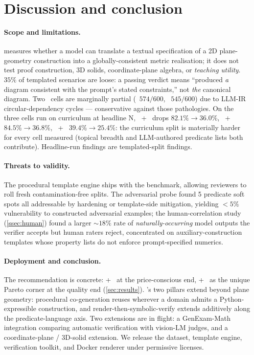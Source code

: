 \section{Discussion and conclusion}
\label{sec:discussion}

\paragraph{Scope and limitations.}
\GeoGenBench measures whether a model can translate a textual specification of a 2D plane-geometry construction into a globally-consistent metric realisation; it does not test proof construction, 3D solids, coordinate-plane algebra, or \emph{teaching utility}.
$35\%$ of templated scenarios are loose: a passing verdict means ``produced \emph{a} diagram consistent with the prompt's stated constraints,'' not \emph{the} canonical diagram.
Two \structured\ cells are marginally partial (\opus\ $574/600$, \gpt\ $545/600$) due to LLM-IR circular-dependency cycles --- conservative against those pathologies.
On the three cells run on curriculum at headline N, \haiku\ + \rawcode\ drops $82.1\% \to 36.0\%$, \haiku\ + \structured\ $84.5\% \to 36.8\%$, \geminiflash\ + \rawcode\ $39.4\% \to 25.4\%$: the curriculum split is materially harder for every cell measured (topical breadth and LLM-authored predicate lists both contribute).
Headline-run findings are templated-split findings.

\paragraph{Threats to validity.}
The procedural template engine ships with the benchmark, allowing reviewers to roll fresh contamination-free splits.
The adversarial probe found 5 predicate soft spots all addressable by hardening or template-side mitigation, yielding $<5\%$ vulnerability to constructed adversarial examples; the human-correlation study (\cref{ssec:human}) found a larger $\sim 18\%$ rate of \emph{naturally-occurring} model outputs the verifier accepts but human raters reject, concentrated on auxiliary-construction templates whose property lists do not enforce prompt-specified numerics.

\paragraph{Deployment and conclusion.}
The recommendation is concrete: \gpt + \rawcode\ at the price-conscious end, \gpt + \structured\ as the unique Pareto corner at the quality end (\cref{sec:results}).
\GeoGen's two pillars extend beyond plane geometry: procedural co-generation reuses wherever a domain admits a Python-expressible construction, and render-then-symbolic-verify extends additively along the predicate-language axis.
Two extensions are in flight: a GenExam-Math \citep{wang2025genexam} integration comparing automatic verification with vision-LM judges, and a coordinate-plane / 3D-solid extension.
We release the dataset, template engine, verification toolkit, and Docker renderer under permissive licenses.
